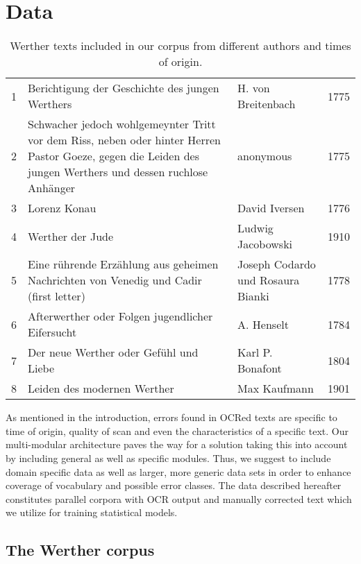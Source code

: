 \documentclass[11pt,letterpaper]{article}
\begin{document}
\section{Data}\label{sec:data}
\begin{table*}[ht]
\centering
\begin{tiny}
\begin{tabular}{lp{8cm}p{4cm}l}
\toprule
1& Berichtigung der Geschichte des jungen Werthers&H. von Breitenbach&1775\\
2& Schwacher jedoch wohlgemeynter Tritt vor dem Riss, neben oder hinter Herren Pastor Goeze, gegen die Leiden des jungen Werthers und dessen ruchlose Anh\"{a}nger&anonymous&1775\\
3& Lorenz Konau& David Iversen& 1776\\
4& Werther der Jude & Ludwig Jacobowski& 1910\\
5& Eine r\"{u}hrende Erz\"{a}hlung aus geheimen Nachrichten von Venedig und Cadir (first letter) &Joseph Codardo und Rosaura Bianki& 1778\\
6& Afterwerther oder Folgen jugendlicher Eifersucht & A. Henselt & 1784\\
7& Der neue Werther oder Gef\"{u}hl und Liebe & Karl P. Bonafont & 1804\\
8& Leiden des modernen Werther & Max Kaufmann & 1901\\
\bottomrule
\end{tabular}
\caption{Werther texts included in our corpus from different authors and times of origin.}
\label{tab:data}
\end{tiny}
\end{table*}

As mentioned in the introduction, errors found in OCRed texts are specific to
time of origin, quality of scan and even the characteristics of a specific text. Our multi-modular
architecture paves the way for a solution taking this into account by including general as well as specific modules.
Thus, we suggest to include domain specific data as well as larger, more generic data sets in order to enhance coverage of vocabulary and possible error classes. 
The data described hereafter constitutes parallel corpora with OCR output and manually corrected text which we utilize for training statistical models.


 
\subsection{The Werther corpus}\label{Werther}
\end{document}
